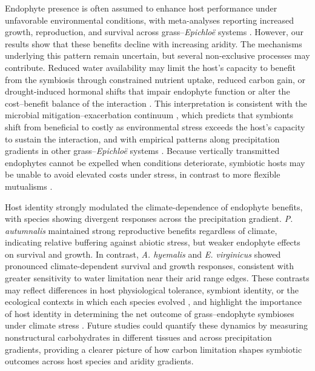 \documentclass[12pt]{article}\usepackage[]{graphicx}\usepackage[dvipsnames]{xcolor}
\begin{document}
Endophyte presence is often assumed to enhance host performance under unfavorable environmental conditions, with meta-analyses reporting increased growth, reproduction, and survival across grass--\textit{Epichloë} systems \citep{decunta2021systematic}. 
However, our results show that these benefits decline with increasing aridity. 
The mechanisms underlying this pattern remain uncertain, but several non-exclusive processes may contribute. 
Reduced water availability may limit the host's capacity to benefit from the symbiosis through constrained nutrient uptake, reduced carbon gain, or drought-induced hormonal shifts that impair endophyte function or alter the cost--benefit balance of the interaction \citep{ahlholm2002vertically, bronstein2001exploitation, faeth2002endophytic, bastias2024epichloe, cui2022abscisic}. 
This interpretation is consistent with the microbial mitigation--exacerbation continuum \citep{david2018microbial}, which predicts that symbionts shift from beneficial to costly as environmental stress exceeds the host's capacity to sustain the interaction, and with empirical patterns along precipitation gradients in other grass--\textit{Epichloë} systems \citep{kannadan2008endophyte}. 
Because vertically transmitted endophytes cannot be expelled when conditions deteriorate, symbiotic hosts may be unable to avoid elevated costs under stress, in contrast to more flexible mutualisms \citep{afkhami2009endophyte}. 

Host identity strongly modulated the climate-dependence of endophyte benefits, with species showing divergent responses across the precipitation gradient.
\textit{P. autumnalis} maintained strong reproductive benefits regardless of climate, indicating relative buffering against abiotic stress, but weaker endophyte effects on survival and growth. 
In contrast, \textit{A. hyemalis} and \textit{E. virginicus} showed pronounced climate-dependent survival and growth responses, consistent with greater sensitivity to water limitation near their arid range edges. 
These contrasts may reflect differences in host physiological tolerance, symbiont identity, or the ecological contexts in which each species evolved  \citep{decunta2021systematic}, and highlight the importance of host identity in determining the net outcome of grass--endophyte symbioses under climate stress \citep{cheplick2009ecology}. 
Future studies could quantify these dynamics by measuring nonstructural carbohydrates in different tissues and across precipitation gradients, providing a clearer picture of how carbon limitation shapes symbiotic outcomes across host species and aridity gradients.
\end{document}
